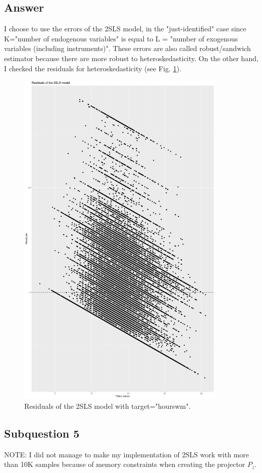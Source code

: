 \documentclass{article}
\begin{document}
	\subsection{Answer}
	I choose to use the errors of the 2SLS model, in the "just-identified" case since K="number of endogenous variables" is equal to L = "number of exogenous variables (including instruments)".
	These errors are also called robust/sandwich estimator because there are more robust to
	heteroskedasticity.
	On the other hand, I checked the residuals for heteroskedasticity (see Fig. \ref{fig:2sls_residuals}).
	
	\begin{figure}[H]\centering
		\includegraphics[width=10cm]{2sls_residuals}
		\caption{Residuals of the 2SLS model with target="hourswm".}
		\label{fig:2sls_residuals}
	\end{figure}
	
	\subsection{Subquestion 5}
	NOTE: I did not manage to make my implementation of 2SLS work with more than 10K samples because of memory constraints when creating the projector $P_z$.
	
\end{document}
